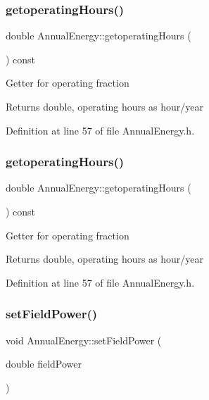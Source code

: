 \subsubsection{\texorpdfstring{getoperating\+Hours()}{getoperatingHours()}\hspace{0.1cm}{\footnotesize\ttfamily [2/3]}}
{\footnotesize\ttfamily double Annual\+Energy\+::getoperating\+Hours (\begin{DoxyParamCaption}{ }\end{DoxyParamCaption}) const\hspace{0.3cm}{\ttfamily [inline]}}

Getter for operating fraction \begin{DoxyReturn}{Returns}
double, operating hours as hour/year 
\end{DoxyReturn}


Definition at line 57 of file Annual\+Energy.\+h.

\mbox{\label{class_annual_energy_a86a176d57507c7be77d0ead5f794af28}} 
\subsubsection{\texorpdfstring{getoperating\+Hours()}{getoperatingHours()}\hspace{0.1cm}{\footnotesize\ttfamily [3/3]}}
{\footnotesize\ttfamily double Annual\+Energy\+::getoperating\+Hours (\begin{DoxyParamCaption}{ }\end{DoxyParamCaption}) const\hspace{0.3cm}{\ttfamily [inline]}}

Getter for operating fraction \begin{DoxyReturn}{Returns}
double, operating hours as hour/year 
\end{DoxyReturn}


Definition at line 57 of file Annual\+Energy.\+h.

\mbox{\label{class_annual_energy_a4f7212fcf2f6fcd2b12f36ca26a368a1}} 
\subsubsection{\texorpdfstring{set\+Field\+Power()}{setFieldPower()}\hspace{0.1cm}{\footnotesize\ttfamily [1/3]}}
{\footnotesize\ttfamily void Annual\+Energy\+::set\+Field\+Power (\begin{DoxyParamCaption}\item[{double}]{field\+Power }\end{DoxyParamCaption})\hspace{0.3cm}{\ttfamily [inline]}}

